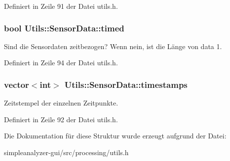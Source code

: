 Definiert in Zeile 91 der Datei utils.\-h.

\hypertarget{structUtils_1_1SensorData_aca94c3ec7e8f2e719f7cfcff4e9da41b}{
\subsubsection[{timed}]{\setlength{\rightskip}{0pt plus 5cm}bool Utils\-::\-Sensor\-Data\-::timed}}\label{structUtils_1_1SensorData_aca94c3ec7e8f2e719f7cfcff4e9da41b}
Sind die Sensordaten zeitbezogen? Wenn nein, ist die Länge von data 1. 

Definiert in Zeile 94 der Datei utils.\-h.

\hypertarget{structUtils_1_1SensorData_a654f9606c3ddc6e93afb86a116d11ea5}{
\subsubsection[{timestamps}]{\setlength{\rightskip}{0pt plus 5cm}vector$<$int$>$ Utils\-::\-Sensor\-Data\-::timestamps}}\label{structUtils_1_1SensorData_a654f9606c3ddc6e93afb86a116d11ea5}
Zeitstempel der einzelnen Zeitpunkte. 

Definiert in Zeile 92 der Datei utils.\-h.



Die Dokumentation für diese Struktur wurde erzeugt aufgrund der Datei\-:\begin{DoxyCompactItemize}
\item 
simpleanalyzer-\/gui/src/processing/utils.\-h\end{DoxyCompactItemize}
